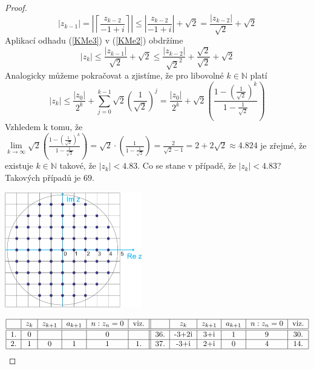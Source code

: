 \documentclass[czech,bachelor,dept470,male]{diploma}
\begin{document}
\begin{proof}
\begin{equation}
		|z_{k-1}| = \left|\left\lceil\frac{z_{k-2}}{-1+i}\right\rceil\right| \leq
		\left|\frac{z_{k-2}}{-1+i}\right| + \sqrt{2} =
		\frac{\left|z_{k-2}\right|}{\sqrt{2}} + \sqrt{2}
	\end{equation}
	Aplikací odhadu (\ref{KMe3}) v (\ref{KMe2}) obdržíme
	\begin{equation*}\label{KMe4}
		|z_k| \leq \frac{\left|z_{k-1}\right|}{\sqrt{2}} + \sqrt{2} \leq \frac{|z_{k-2}|}{\sqrt{2}^2} + \frac{\sqrt{2}}{\sqrt{2}} + \sqrt{2}
	\end{equation*}
	Analogicky můžeme pokračovat a zjistíme, že pro libovolné $k \in \mathbb{N}$ platí
	\begin{equation}\label{KMe5}
		|z_k| \leq\frac{|z_0|}{2^k}+\sum_{j=0}^{k-1}\sqrt{2}\left(\frac{1}{\sqrt{2}}\right)^j = \frac{|z_0|}{2^k}+ \sqrt{2}\left( \frac{ 1- \left(\frac{1}{\sqrt{2} } \right)^k}{1 - \frac{1}{\sqrt{2}}}\right)\end{equation}
	Vzhledem k tomu, že $\lim\limits_{k\to\infty}\sqrt{2}\left( \frac{ 1- \left(\frac{1}{\sqrt{2} } \right)^k}{1 - \frac{1}{\sqrt{2}}}\right)=\sqrt{2}\cdot\left( \frac{1}{1 - \frac{1}{\sqrt{2}}}\right)=\frac{2}{\sqrt{2}-1}=2+2\sqrt{2}\approx4.824$\newline
	je zřejmé, že existuje $k \in \mathbb{N}$ takové, že $|z_{k}| <4.83$.
	Co se stane v případě, že $|z_k| < 4.83$?\newline Takových případů je $69$.
	\begin{center}
		\includegraphics[width=6cm]{data/complex.png}
	\end{center}
	\begin{equation*}
		\begin{tabular}{|c|c|c|c|c|c||c|c|c|c|c|c|}\hline
			    & $z_k$ & $z_{k+1}$ & $a_{k+1}$ & $n:z_n=0$ & viz. &     & $z_k$ & $z_{k+1}$ & $a_{k+1}$ & $n:z_n=0$ & viz. \\ \hline \hline
			1.  & 0     &           &           & 0         &      & 36. & -3+2i & 3+i       & 1         & 9         & 30.  \\\hline
			2.  & 1     & 0         & 1         & 1         & 1.   & 37. & -3+i  & 2+i       & 0         & 4         & 14.  \\\hline

\end{tabular}
\end{equation*}
\end{proof}
\end{document}
